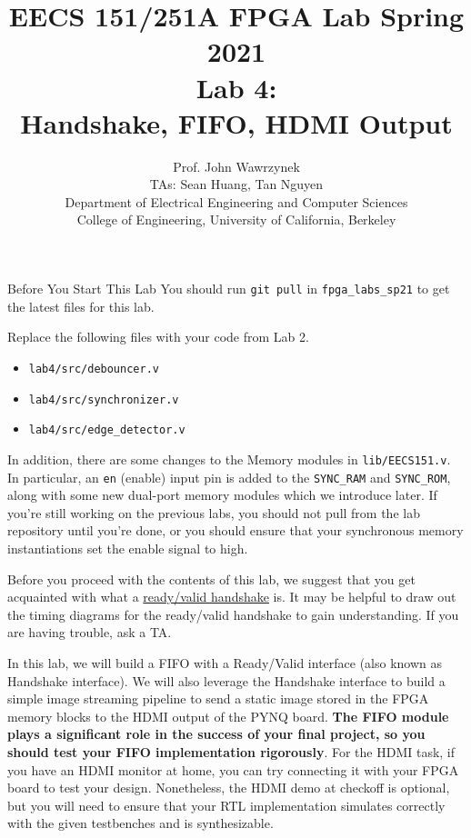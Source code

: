 \documentclass[11pt]{article}
\makeatletter
\renewcommand{\section}
{\@startsection {section}{1}{0pt}
 {-2ex}
 {1ex}
 {\bfseries\Large}}
\makeatother
\begin{document}
\def\PYZsq{\textquotesingle}
\title{\vspace{-0.4in}\Large \bf EECS 151/251A FPGA Lab Spring 2021\\
Lab 4:\\Handshake, FIFO, HDMI Output\vspace{-0.1in}}

\author{Prof. John Wawrzynek \\
TAs: Sean Huang, Tan Nguyen \\ Department of Electrical Engineering and Computer Sciences\\
College of Engineering, University of California, Berkeley}
\date{}
\maketitle

\section{Before You Start This Lab}
You should run \verb|git pull| in \verb|fpga_labs_sp21| to get the latest files for this lab.

Replace the following files with your code from Lab 2.
\begin{itemize}
  \item \verb|lab4/src/debouncer.v|
  \item \verb|lab4/src/synchronizer.v|
  \item \verb|lab4/src/edge_detector.v|
\end{itemize}

In addition, there are some changes to the Memory modules in \verb|lib/EECS151.v|. In particular, an \verb|en| (enable) input pin is added to the \verb|SYNC_RAM| and \verb|SYNC_ROM|, along with some new dual-port memory modules which we introduce later. If you're still working on the previous labs, you should not pull from the lab repository until you're done, or you should ensure that your synchronous memory instantiations set the enable signal to high.

Before you proceed with the contents of this lab, we suggest that you get acquainted with what a \href{http://inst.eecs.berkeley.edu/~eecs151/sp20/files/verilog/ready_valid_interface.pdf}{ready/valid handshake} is. It may be helpful to draw out the timing diagrams for the ready/valid handshake to gain understanding. If you are having trouble, ask a TA. 

In this lab, we will build a FIFO with a Ready/Valid interface (also known as Handshake interface). We will also leverage the Handshake interface to build a simple image streaming pipeline to send a static image stored in the FPGA memory blocks to the HDMI output of the PYNQ board. \textbf{The FIFO module plays a significant role in the success of your final project, so you should test your FIFO implementation rigorously}. For the HDMI task, if you have an HDMI monitor at home, you can try connecting it with your FPGA board to test your design. Nonetheless, the HDMI demo at checkoff is optional, but you will need to ensure that your RTL implementation simulates correctly with the given testbenches and is synthesizable.
\end{document}
